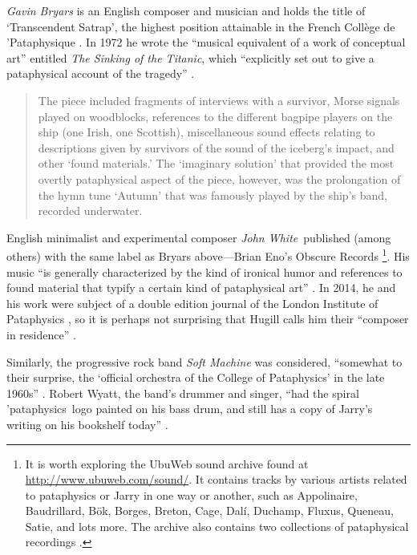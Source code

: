 \emph{Gavin Bryars} is an English composer and musician and holds the title of `Transcendent Satrap', the highest position attainable in the French Collège de {'}Pataphysique \autocite{Bryars2010}. In 1972 he wrote the ``musical equivalent of a work of conceptual art'' \autocite*{Bryars2009} entitled \textit{The Sinking of the Titanic}, which ``explicitly set out to give a pataphysical account of the tragedy'' \autocite{Hugill2012}.

\begin{quotation}
  The piece included fragments of interviews with a survivor, Morse signals played on woodblocks, references to the different bagpipe players on the ship (one Irish, one Scottish), miscellaneous sound effects relating to descriptions given by survivors of the sound of the iceberg’s impact, and other `found materials.' The `imaginary solution' that provided the most overtly pataphysical aspect of the piece, however, was the prolongation of the hymn tune `Autumn' that was famously played by the ship’s band, recorded underwater. 
\end{quotation}

English minimalist and experimental composer \emph{John White}\ published (among others) with the same label as Bryars above---Brian Eno's Obscure Records \autocite{UbuWeb}\footnote{It is worth exploring the UbuWeb sound archive found at \url{http://www.ubuweb.com/sound/}. It contains tracks by various artists related to pataphysics or Jarry in one way or another, such as Appolinaire, Baudrillard, Bök, Borges, Breton, Cage, Dalí, Duchamp, Fluxus, Queneau, Satie, and lots more. The archive also contains two collections of pataphysical recordings \autocite{UbuWebUseless, UbuWebPata}.}. His music ``is generally characterized by the kind of ironical humor and references to found material that typify a certain kind of pataphysical art'' \autocite{Hugill2012}. In 2014, he and his work were subject of a double edition journal of the London Institute of Pataphysics \autocite{Smith2014, White2014}, so it is perhaps not surprising that Hugill calls him their ``composer in residence'' \autocite{Hugill2012}. 

Similarly, the progressive rock band \emph{Soft Machine} was considered, ``somewhat to their surprise, the `official orchestra of the College of Pataphysics' in the late 1960s'' \autocite{Hugill2012}. Robert Wyatt, the band's drummer and singer, ``had the spiral {'}pataphysics logo painted on his bass drum, and still has a copy of Jarry's writing on his bookshelf today'' \autocite{ODair2014}.

